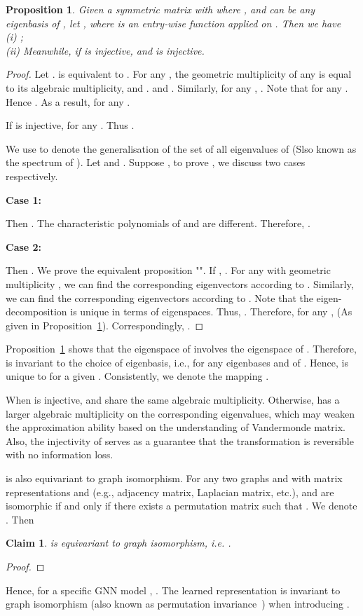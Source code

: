 \documentclass[nohyperref]{article}
\newtheorem{claim}{Claim}
\theoremstyle{plain}
\newtheorem{proposition}[theorem]{Proposition}
\theoremstyle{definition}
\theoremstyle{remark}
\begin{document}
\begin{proposition}
	\label{prop:eig_mapping}
	Given a symmetric matrix  with  where , and  can be any eigenbasis of ,
	let , where  is an entry-wise function applied on . Then we have \\
	(i) ; \\
	(ii) Meanwhile, if  is injective,  and  is injective.
\end{proposition}

\begin{proof}
	
	Let .
	 is equivalent to .
	For any , the geometric multiplicity of any  is equal to its algebraic multiplicity, and .
	 and .
	Similarly, for any , .
	Note that  for any .
	Hence .
	As a result,  for any .
	
	If  is injective,  for any .
	Thus .
	
	We use  to denote the generalisation of the set of all eigenvalues of  (Slso known as the spectrum of ).
	Let  and .
	Suppose ,
	to prove , we discuss two cases respectively.
	
	\textbf{Case 1:} 
	
	Then .
	The characteristic polynomials of  and  are different.
	Therefore, .
	
	\textbf{Case 2:} 
	
	Then .
	We prove the equivalent proposition "".
	If , .
	For any  with geometric multiplicity , we can find the corresponding eigenvectors  according to .
	Similarly, we can find the corresponding eigenvectors  according to .
	Note that the eigen-decomposition is unique in terms of eigenspaces.
	Thus, .
	Therefore, for any ,  (As given in Proposition~\ref{prop:eig_mapping}).
	Correspondingly, .
	
\end{proof}

Proposition~\ref{prop:eig_mapping} shows that the eigenspace of  involves the eigenspace of .
Therefore,  is invariant to the choice of eigenbasis, i.e.,  for any eigenbases  and  of .
Hence,  is unique to  for a given .
Consistently, we denote the mapping .

When  is injective,  and  share the same algebraic multiplicity.
Otherwise,  has a larger algebraic multiplicity on the corresponding eigenvalues, which may weaken the approximation ability based on the understanding of Vandermonde matrix.
Also, the injectivity of  serves as a guarantee that the transformation is reversible with no information loss.

 is also equivariant to graph isomorphism.
For any two graphs  and  with matrix representations  and  (e.g., adjacency matrix, Laplacian matrix, etc.),  and  are isomorphic if and only if there exists a permutation matrix  such that .
We denote .
Then
\begin{claim}
	 is equivariant to graph isomorphism, i.e. .
\end{claim}
\begin{proof}
	
\end{proof}
Hence, for a specific GNN model , .
The learned representation is invariant to graph isomorphism (also known as permutation invariance~\cite{NIPS2017_f22e4747,murphy2018janossy}) when introducing .
\end{document}
